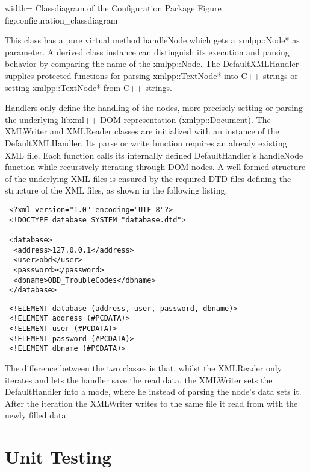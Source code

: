  {width=\textwidth}%
 {Classdiagram of the Configuration Package}%
 {Figure}%
 {fig:configuration_classdiagram}%

This class has a pure virtual method handleNode which gets a xmlpp::Node* as parameter. A derived class instance can distinguish its execution 
and parsing behavior by comparing the name of the xmlpp::Node. The DefaultXMLHandler supplies protected functions for parsing 
xmlpp::TextNode* into C++ strings or setting xmlpp::TextNode* from C++ strings. 

Handlers only define the handling of the nodes, more precisely setting or parsing the underlying libxml++ DOM representation (xmlpp::Document). 
The XMLWriter and XMLReader classes are initialized with an instance of the DefaultXMLHandler. Its parse or write function requires an already 
existing XML file. Each function calls its internally defined DefaultHandler’s handleNode function while recursively iterating through DOM nodes. 
A well formed structure of the underlying XML files is ensured by the required DTD files defining the structure of the XML files, as shown in the following listing:

\begin{verbatim}
 <?xml version="1.0" encoding="UTF-8"?>
 <!DOCTYPE database SYSTEM "database.dtd">

 <database>
  <address>127.0.0.1</address>
  <user>obd</user>
  <password></password>
  <dbname>OBD_TroubleCodes</dbname>
 </database>
\end{verbatim}

\begin{verbatim}
 <!ELEMENT database (address, user, password, dbname)>
 <!ELEMENT address (#PCDATA)>
 <!ELEMENT user (#PCDATA)>
 <!ELEMENT password (#PCDATA)>
 <!ELEMENT dbname (#PCDATA)>
\end{verbatim}

The difference between the two classes is that, whilst the XMLReader only iterates and lets the handler save the read data, the XMLWriter sets 
the DefaultHandler into a mode, where he instead of parsing the node’s data sets it. After the iteration the XMLWriter writes to the same file 
it read from with the newly filled data.

\section{Unit Testing}

